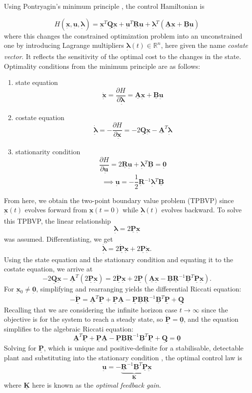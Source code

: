 \documentclass[12pt]{article}
\newcommand{\vb}[1]{{\underset{\tilde{}}{\mathbf{#1}}}}
\newcommand{\mb}[1]{\underline{\mathbf{#1}}}
\begin{document}
Using Pontryagin's minimum principle \cite{Pontryagin1962}, the control Hamiltonian is

\[
H(\vb{x}{}, \vb{u}{}, \vb{\boldsymbol{\lambda}}{}) = \vb{x}{}^T \mb{Q}\vb{x} + \vb{u}{}^T \mb{R} \vb{u}{} + \vb{\boldsymbol{\lambda}}{}^T (\mb{A}\vb{x} +\mb{B}\vb{u})
\]
where this changes the constrained optimization problem into an unconstrained one by introducing Lagrange multipliers $\vb{\boldsymbol{\lambda}}(t) \in \mathbb{R}^n$, here given the name \textit{costate vector}. It reflects the sensitivity of the optimal cost to the changes in the state. Optimality conditions from the minimum principle are as follows:
\begin{enumerate}
    \item state equation  \[\dot{\vb{x}} = \frac{\partial H}{\partial \vb{\boldsymbol{\lambda}}{}}=\mb{A}\vb{x} +\mb{B}\vb{u}\]
    \item costate equation \[ \dot{\vb{\boldsymbol{\lambda}}} = -\frac{\partial H}{\partial \vb{\boldsymbol{x}}{}}= -2\mb{Q}\vb{x}{}-\mb{A}^T\vb{\boldsymbol{\lambda}}\]
    \item stationarity condition \[\frac{\partial H}{\partial \vb{u}{}} = 2\mb{R}\vb{u} + \vb{\boldsymbol{\lambda}}{}^T\mb{B}=\vb{0}{}\]
    \[
    \implies\vb{u}{} =-\frac{1}{2}\vb{R}{}^{-1}\vb{\boldsymbol{\lambda}}{}^T\mb{B}
    \]
\end{enumerate}

From here, we obtain the two-point boundary value problem (TPBVP) since $\vb{x}(t)$ evolves forward from $\vb{x}{}(t=0)$ while $\vb{\boldsymbol{\lambda}}{}(t)$ evolves backward. To solve this TPBVP, the linear relationship 
\[
\vb{\boldsymbol{\lambda}}{} = 2 \mb{P}\vb{x}{}
\]
was assumed. Differentiating, we get
\[
\dot{\vb{\boldsymbol{\lambda}}{}} =  2 \dot{\mb{P}}\vb{x}{} +  2 \mb{P}\dot{\vb{x}{}}.
\]
Using the state equation and the stationary condition and equating it to the costate equation, we arrive at
\[
-2\mb{Q}\vb{x}{}-\mb{A}^T (2\mb{P}\vb{x}{} )= 2\dot{\mb{P}}\vb{x}{} + 2\mb{P}\left( \mb{A} \vb{x}{} - \mb{B} \mb{R}^{-1} \mb{B}^T   \mb{P}\vb{x}{}  \right).
\]
For $\vb{x}{}_0 \neq \vb{0}{}$, simplifying and rearranging yields the differential Riccati equation:
\[
 -\dot{\mb{P}}= \mb{A}^T \mb{P} +\mb{P} \mb{A} - \mb{P} \mb{B} \mb{R}^{-1} \mb{B}^T   \mb{P}+\mb{Q}
\]
Recalling that we are considering the infinite horizon case $t \to \infty$ since the objective is for the system to reach a steady state, so $\dot{\mb{P}} = \mb{0}$, and the equation simplifies to the algebraic Riccati equation:
\begin{equation}
        \mb{A}^T \mb{P} +\mb{P} \mb{A} - \mb{P} \mb{B} \mb{R}^{-1} \mb{B}^T   \mb{P}+\mb{Q} =\mb{0}
        \label{eq:riccati-continuous-eq}
\end{equation}
Solving for $\mb{P}$, which is unique and positive-definite for a stabilisable, detectable plant and substituting into the stationary condition \cite{AndersonMoore1990,Laub1979}, the optimal control law is
\begin{equation}
    \vb{u}{} = - \underbrace{\mb{R}^{-1}\mb{B}^T\mb{P}} _{\mb{K}}\vb{x}{}
    \label{eq:control-law-continuous}
\end{equation}
where $\mb{K}$ here is known as the \textit{optimal feedback gain}.
\end{document}
